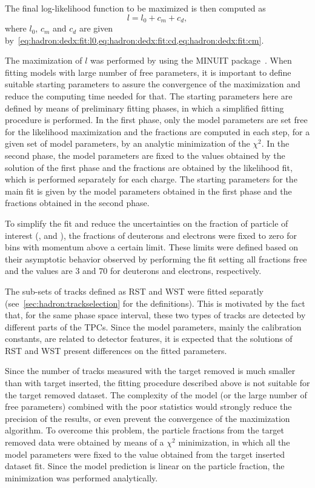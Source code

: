The final log-likelihood function to be maximized is then
computed as
\begin{equation}
  l = l_0+c_m+c_d,
  \label{eq:hadron:dedx:fit:l}
\end{equation}
where $l_0$, $c_m$ and $c_d$ are given
by~\cref{eq:hadron:dedx:fit:l0,eq:hadron:dedx:fit:cd,eq:hadron:dedx:fit:cm}.

The maximization of $l$
was performed by using the MINUIT package~\cite{James:1975dr}.
When fitting models with large number of free parameters,
it is important to define suitable starting parameters
to assure the convergence of the maximization and
reduce the computing time needed for that.
The starting parameters here are defined by means of
preliminary fitting phases, in which a simplified fitting
procedure is performed. In the first phase, only the model
parameters are set free for the likelihood maximization
and the fractions are computed in each step,
for a given set of model parameters, by an
analytic minimization of the $\chi^2$.
In the second phase, the model parameters are fixed
to the values obtained by the solution of the first phase
and the fractions are obtained by the likelihood fit,
which is performed separately for each charge.
The starting parameters for the main fit is given by
the model parameters obtained in the first phase and the
fractions obtained in the second phase.

To simplify the fit and reduce the uncertainties on the
fraction of particle of interest (\pions, \kaons and \protons),
the fractions of deuterons and electrons were fixed to zero
for bins with momentum above a certain limit. These limits were
defined based on their asymptotic behavior observed by performing
the fit setting all fractions free and the values are 3 and 70 \GeVc
for deuterons and electrons, respectively. 

The sub-sets of tracks defined as RST and WST were fitted
separatly (see~\cref{sec:hadron:trackselection} for the definitions).
This is motivated by the fact that, for the same phase space
interval, these two types of tracks are detected by
different parts of the TPCs. Since the model parameters,
mainly the calibration constants, are related to
detector features, it is expected that the solutions
of RST and WST present differences on the fitted
parameters.

Since the number of tracks measured with the target removed is much
smaller than with target inserted, the
fitting procedure described above is not suitable for the
target removed dataset. The complexity of the model
(or the large number of free parameters) combined with
the poor statistics would strongly reduce the precision of
the results, or even prevent the convergence of the maximization
algorithm. To overcome this problem, the particle fractions
from the target removed data were obtained by means of
a $\chi^2$ minimization, in which all the model parameters
were fixed to the value obtained from the target inserted
dataset fit. Since the model prediction is linear on
the particle fraction, the minimization was performed
analytically. 

